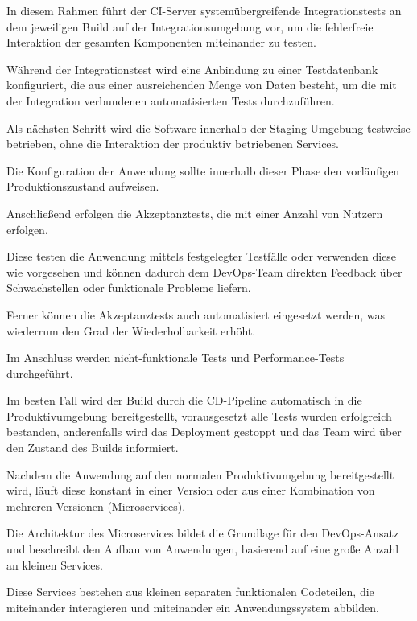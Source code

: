 In diesem Rahmen führt der CI-Server systemübergreifende Integrationstests an dem jeweiligen Build auf der Integrationsumgebung vor, um die fehlerfreie Interaktion der gesamten Komponenten miteinander zu testen. \cite[S. 122]{kim_devops-handbuch_2017} 

Während der Integrationstest wird eine Anbindung zu einer Testdatenbank konfiguriert, die aus einer ausreichenden Menge von Daten besteht, um die mit der Integration verbundenen automatisierten Tests durchzuführen. \cite[S. 100 - 101]{bass_devops_2015}

Als nächsten Schritt wird die Software innerhalb der Staging-Umgebung testweise betrieben, ohne die Interaktion der produktiv betriebenen Services. 

Die Konfiguration der Anwendung sollte innerhalb dieser Phase den vorläufigen Produktionszustand aufweisen. \cite[S. 100 - 101]{bass_devops_2015} 

Anschließend erfolgen die Akzeptanztests, die mit einer Anzahl von Nutzern erfolgen. 

Diese testen die Anwendung mittels festgelegter Testfälle oder verwenden diese wie vorgesehen und können dadurch dem DevOps-Team direkten Feedback über Schwachstellen oder funktionale Probleme liefern. \cite[S. 16 - 18]{sharma_devops_2017}

Ferner können die Akzeptanztests auch automatisiert eingesetzt werden, was wiederrum den Grad der Wiederholbarkeit erhöht. 

Im Anschluss werden nicht-funktionale Tests und Performance-Tests durchgeführt.

Im besten Fall wird der Build durch die CD-Pipeline automatisch in die Produktivumgebung bereitgestellt, vorausgesetzt alle Tests wurden erfolgreich bestanden, anderenfalls wird das Deployment gestoppt und das Team wird über den Zustand des Builds informiert. \cite[S. 64]{forsgren_mindset_2019} 

Nachdem die Anwendung auf den normalen Produktivumgebung bereitgestellt wird, läuft diese konstant in einer Version oder aus einer Kombination von mehreren Versionen (Microservices). \cite[S. 86]{kim_devops-handbuch_2017}  

Die Architektur des Microservices bildet die Grundlage für den DevOps-Ansatz und beschreibt den Aufbau von Anwendungen, basierend auf eine große Anzahl an kleinen Services. \cite{sollner_devops_2017}

Diese Services bestehen aus kleinen separaten funktionalen Codeteilen, die miteinander interagieren und miteinander ein Anwendungssystem abbilden.  

